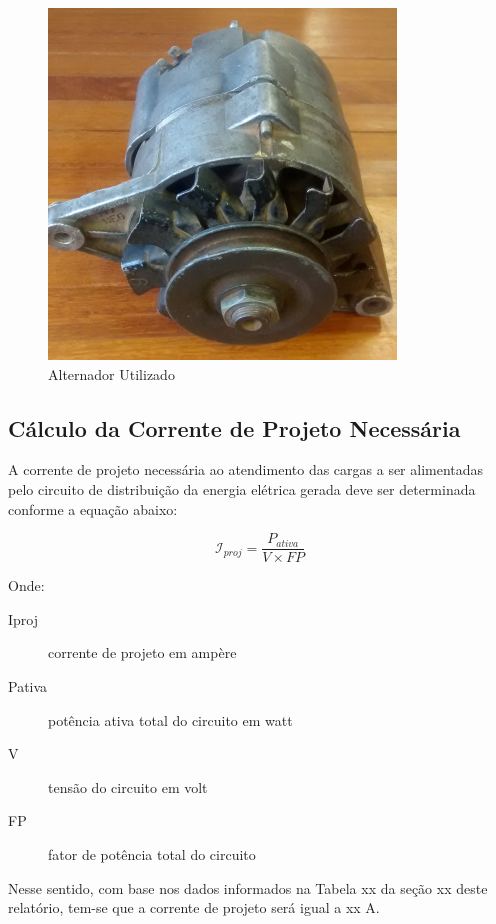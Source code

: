 \begin{figure}[h]
	\centering
	\includegraphics[scale=1]		{figuras/alternador.png}
	\caption{Alternador Utilizado}
	\label{alternador}
\end{figure}

\subsection{Cálculo da Corrente de Projeto Necessária}

A corrente de projeto necessária ao atendimento das cargas a ser alimentadas pelo circuito de distribuição da energia elétrica gerada deve ser determinada conforme a equação abaixo:

\begin{equation}
	\label{Função para geração de números aleatórios.}
	\mathcal{I}_{proj} = \frac{{P}_{ativa}}{V \times FP}
\end{equation}

Onde:
\begin{description}

\item [Iproj] corrente de projeto em ampère

\item [Pativa] potência ativa total do circuito em watt

\item [V] tensão do circuito em volt

\item [FP] fator de potência total do circuito
\end{description}

Nesse sentido, com base nos dados informados na Tabela xx da seção xx deste relatório, tem-se que a corrente de projeto será igual a xx A.

